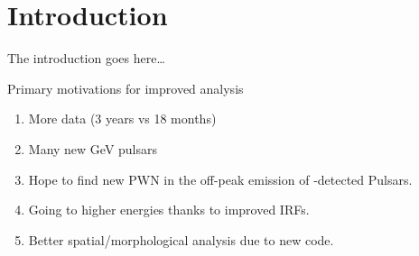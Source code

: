 \section{Introduction}

The introduction goes here\ldots


Primary motivations for improved analysis
\begin{enumerate}
  \item More data (3 years vs 18 months)
  \item Many new GeV pulsars
  \item Hope to find new PWN in the off-peak emission of \lat-detected \gev Pulsars.
  \item Going to higher energies thanks to improved IRFs.
  \item Better spatial/morphological analysis due to new \pointlike code.
\end{enumerate}
